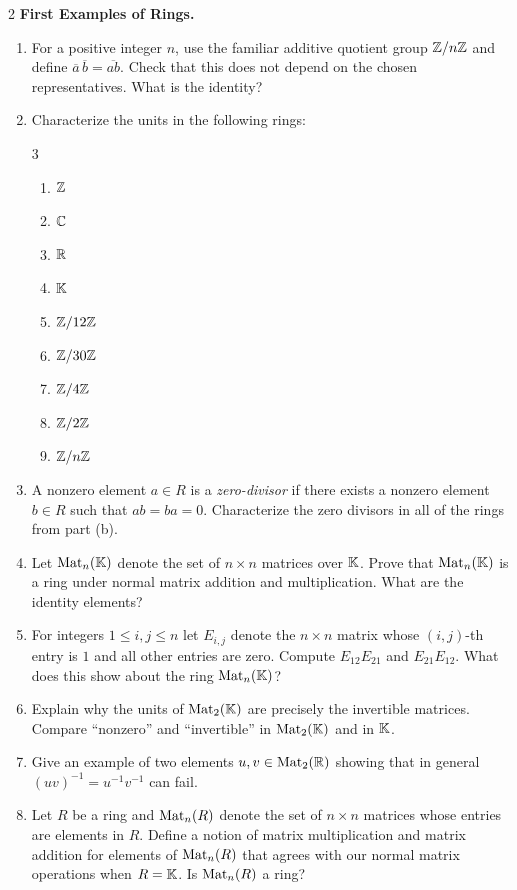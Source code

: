 \documentclass[Notebook.tex]{subfiles}
\begin{document}
\begin{problem}{2}\label{r:examples}
	\textbf{First Examples of Rings.}
	\begin{enumerate}[label=(\alph*),ref=\theenumi\alph*]
		\item For a positive integer $n$, use the familiar additive quotient group $\mathbb Z/n\mathbb Z$ and define $\overline a\,\overline b=\overline{ab}$. Check that this does not depend on the chosen representatives. What is the identity?
		\item Characterize the units in the following rings:
		\begin{multicols}{3}
			\begin{enumerate}[label=(\roman*),ref=\theenumi\roman*]
				\item $\mathbb Z$
				\item $\mathbb C$
				\item $\mathbb R$
				\item $\mathbb K$
				\item $\mathbb Z/12\mathbb Z$
				\item $\mathbb Z/30\mathbb Z$
				\item $\mathbb Z/4\mathbb Z$
				\item $\mathbb Z/2\mathbb Z$
				\item $\mathbb Z/n\mathbb Z$
			\end{enumerate}
		\end{multicols}
		\item A nonzero element $a \in R$ is a \emph{zero-divisor} if there exists a nonzero element $b \in R$ such that $ab=ba=0$. Characterize the zero divisors in all of the rings from part (b).
		\item Let $\operatorname{Mat}_n(\mathbb K)$ denote the set of $n\times n$ matrices over $\mathbb K$. Prove that $\operatorname{Mat}_{n}(\mathbb K)$ is a ring under normal matrix addition and multiplication. What are the identity elements?
		\item For integers $1\leq i,j\leq n$ let $E_{i,j}$ denote the $n\times n$ matrix whose $(i,j)$-th entry is $1$ and all other entries are zero. Compute $E_{12}E_{21}$ and $E_{21}E_{12}$. What does this show about the ring $\operatorname{Mat}_{n}(\mathbb K)$?
		\item Explain why the units of $\operatorname{Mat}_2(\mathbb K)$ are precisely the invertible matrices. Compare ``nonzero'' and ``invertible'' in $\operatorname{Mat}_2(\mathbb K)$ and in $\mathbb K$.
		\item Give an example of two elements $u,v \in \operatorname{Mat}_{2}(\mathbb R)$ showing that in general $(uv)^{-1}=u^{-1}v^{-1}$ can fail.
		\item Let $R$ be a ring and $\operatorname{Mat}_n(R)$ denote the set of $n\times n$ matrices whose entries are elements in $R$. Define a notion of matrix multiplication and matrix addition for elements of $\operatorname{Mat}_n(R)$ that agrees with our normal matrix operations when $R=\mathbb K$. Is $\operatorname{Mat}_n(R)$ a ring?
	\end{enumerate}
\end{problem}
\end{document}
